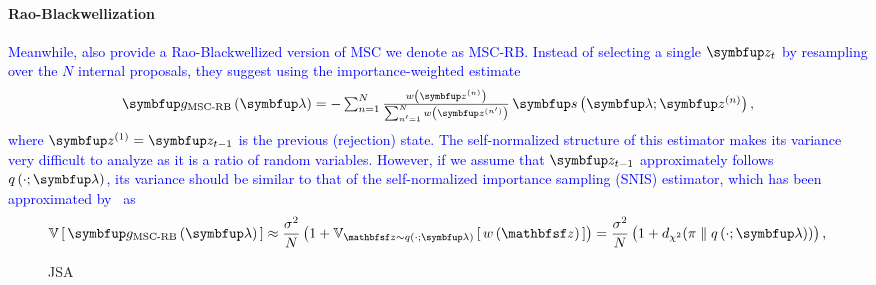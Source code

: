 \paragraph{Rao-Blackwellization}
\textcolor{blue}{
Meanwhile, \citeauthor{NEURIPS2020_b2070693} also provide a Rao-Blackwellized version of MSC we denote as MSC-RB.
Instead of selecting a single \(\vz_t\) by resampling over the \(N\) internal proposals, they suggest using the importance-weighted estimate%
}
{
\begin{align*}
\textstyle
        \vg_{\text{MSC-RB}}\left(\vlambda\right) = - \sum^{N}_{n=1} {
\frac{w\left(\vz^{(n)}\right)}{ \sum^{N}_{n^{\prime}=1} w\left(\vz^{(n^{\prime})}\right)}
} \, \vs\left(\vlambda;\vz^{(n)}\right),
\end{align*}%
}%
\textcolor{blue}{
where \(\vz^{(1)} = \vz_{t-1}\) is the previous (rejection) state.
The self-normalized structure of this estimator makes its variance very difficult to analyze as it is a ratio of random variables.
However, if we assume that \(\vz_{t-1}\) approximately follows \(q\left(\cdot; \vlambda\right)\), its variance should be similar to that of the self-normalized importance sampling (SNIS) estimator, which has been approximated by~\citet{kong_note_1992, kong_sequential_1994, elvira_rethinking_2022} as%
}
\begin{align}
\V{ \vg_{\text{MSC-RB}}\left(\vlambda\right) } \approx
\frac{
    \sigma^2
}{
    N
}
\left(1 + \Vsub{\rvvz \sim q\left(\cdot; \vlambda\right)}{ w\left(\rvvz\right) }\right)
=
\frac{
    \sigma^2
}{
    N
}
\left( 1 + \DChi{\pi}{q\left(\cdot; \vlambda\right)} \right),\label{eq:snis_var}
\end{align}
%
\begin{wrapfigure}[17]{r}{0.4\textwidth}
  \vspace{-2ex}
  \begin{minipage}[c]{0.4\textwidth}
    \begin{algorithm2e}[H]
      \DontPrintSemicolon
      \SetAlgoLined
      \caption{JSA}\label{alg:jsa}
    \end{algorithm2e}
  \end{minipage}
\end{wrapfigure}
